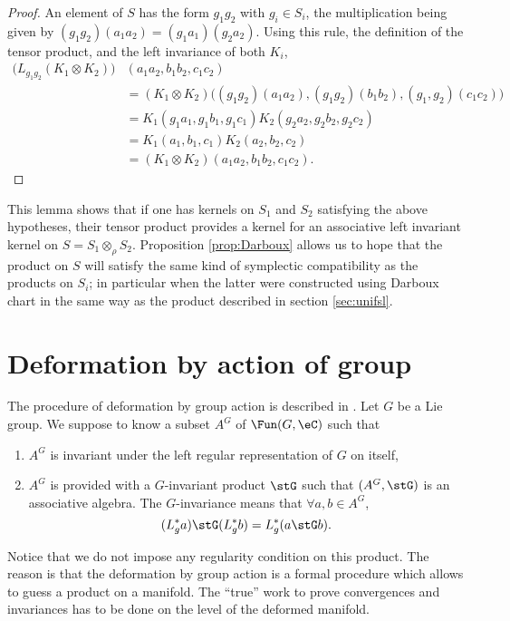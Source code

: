 \begin{proof}
An element of $S$ has the form $g_1g_2$ with $g_i\in S_i$, the multiplication being given by $(g_1g_2)(a_1a_2)=(g_1a_1)(g_2a_2)$. Using this rule, the definition of the tensor product, and the left invariance of both $K_i$,
\[ 
\begin{split}
\big( L_{g_1g_2}(K_1\otimes K_2) \big)&(a_1a_2,b_1b_2,c_1c_2)\\
			&=(K_1\otimes K_2)\big( (g_1g_2)(a_1a_2),(g_1g_2)(b_1b_2),(g_1,g_2)(c_1c_2) \big)\\
			&=K_1(g_1a_1,g_1b_1,g_1c_1)K_2(g_2a_2,g_2b_2,g_2c_2)\\
			&=K_1(a_1,b_1,c_1)K_2(a_2,b_2,c_2)\\
			&=(K_1\otimes K_2)(a_1a_2,b_1b_2,c_1c_2).
\end{split}  
\]

\end{proof}

This lemma shows that if one has kernels on $S_1$ and $S_2$ satisfying the above hypotheses, their tensor product provides a kernel for an associative left invariant kernel on $S=S_1\otimes_{\rho} S_2$.  Proposition \ref{prop:Darboux} allows us to hope that the product on $S$ will satisfy the same kind of symplectic compatibility as the products on $S_i$; in particular when the latter were constructed using Darboux chart in the same way as the product described in section  \ref{sec:unifsl}.

\section{Deformation by action of group}  	\label{SecDefAction}		%

The procedure of deformation by group action is described in \cite{TrsStProd}. Let $G$ be a Lie group. We suppose to know a subset $A^G$ of $\Fun(G,\eC)$  such that
\begin{enumerate}
\item $A^G$ is invariant under the left regular representation of $G$ on itself,
\item $A^G$ is provided with a $G$-invariant product $\stG$ such that $(A^G,\stG)$ is an associative algebra. The $G$-invariance means that $\forall a,b\in A^G$,
\[
    (L^*_ga)\stG(L^*_gb)=L^*_g(a\stG b).
\]
\end{enumerate}

Notice that we do not impose any regularity condition on this product. The reason is that the deformation by group action is a formal procedure which allows to guess a product on a manifold. The ``true'' work to prove convergences and invariances has to be done on the level of the deformed manifold.

